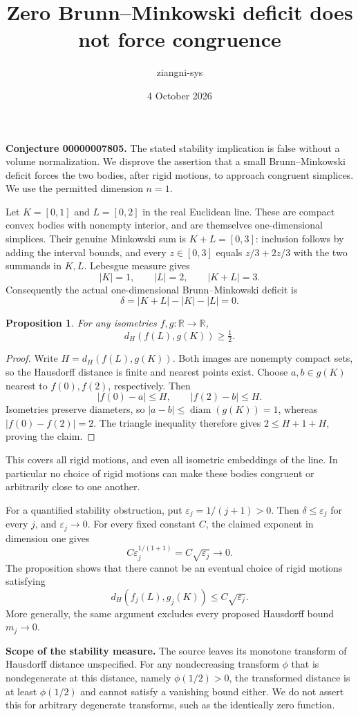 \documentclass[11pt]{article}
\title{Zero Brunn--Minkowski deficit does not force congruence}
\author{ziangni-sys}
\date{4 October 2026}
\newtheorem{proposition}{Proposition}
\begin{document}
\maketitle
\noindent\textbf{Conjecture 00000007805.} The stated stability implication is false without a volume normalization. We disprove the assertion that a small Brunn--Minkowski deficit forces the two bodies, after rigid motions, to approach congruent simplices. We use the permitted dimension $n=1$.

Let $K=[0,1]$ and $L=[0,2]$ in the real Euclidean line. These are compact convex bodies with nonempty interior, and are themselves one-dimensional simplices. Their genuine Minkowski sum is $K+L=[0,3]$: inclusion follows by adding the interval bounds, and every $z\in[0,3]$ equals $z/3+2z/3$ with the two summands in $K,L$. Lebesgue measure gives
\[
 |K|=1,\qquad |L|=2,\qquad |K+L|=3.
\]
Consequently the actual one-dimensional Brunn--Minkowski deficit is
\[
 \delta=|K+L|-|K|-|L|=0.
\]
\begin{proposition}
For any isometries $f,g:\mathbb R\to\mathbb R$,
\[
 d_H(f(L),g(K))\geq \tfrac12.
\]
\end{proposition}
\begin{proof}
Write $H=d_H(f(L),g(K))$. Both images are nonempty compact sets, so the Hausdorff distance is finite and nearest points exist. Choose $a,b\in g(K)$ nearest to $f(0),f(2)$, respectively. Then
\[
 |f(0)-a|\leq H,\qquad |f(2)-b|\leq H.
\]
Isometries preserve diameters, so $|a-b|\leq\operatorname{diam}(g(K))=1$, whereas $|f(0)-f(2)|=2$. The triangle inequality therefore gives $2\leq H+1+H$, proving the claim.
\end{proof}
This covers all rigid motions, and even all isometric embeddings of the line. In particular no choice of rigid motions can make these bodies congruent or arbitrarily close to one another.

For a quantified stability obstruction, put $\varepsilon_j=1/(j+1)>0$. Then $\delta\leq\varepsilon_j$ for every $j$, and $\varepsilon_j\to0$. For every fixed constant $C$, the claimed exponent in dimension one gives
\[
 C\varepsilon_j^{1/(1+1)}=C\sqrt{\varepsilon_j}\longrightarrow0.
\]
The proposition shows that there cannot be an eventual choice of rigid motions satisfying
\[
 d_H(f_j(L),g_j(K))\leq C\sqrt{\varepsilon_j}.
\]
More generally, the same argument excludes every proposed Hausdorff bound $m_j\to0$.

\noindent\textbf{Scope of the stability measure.} The source leaves its monotone transform of Hausdorff distance unspecified. For any nondecreasing transform $\phi$ that is nondegenerate at this distance, namely $\phi(1/2)>0$, the transformed distance is at least $\phi(1/2)$ and cannot satisfy a vanishing bound either. We do not assert this for arbitrary degenerate transforms, such as the identically zero function.
\end{document}

